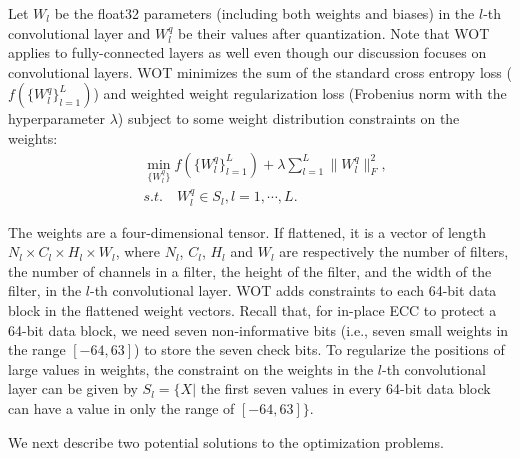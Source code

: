 \documentclass{article}
\begin{document}
Let $W_l$ be the float32 parameters (including both weights and biases) in the $l$-th convolutional layer and $W_l^q$ be their values after quantization. Note that WOT applies to fully-connected layers as well even though our discussion focuses on convolutional layers.  WOT minimizes the sum of the standard cross entropy loss ($f(\{W_l^q\}_{l=1}^{L})$) and weighted weight regularization loss (Frobenius norm with the hyperparameter $\lambda$) subject to some weight distribution constraints on the weights:
\begin{align}
    & \min_{\{W_l^q\}} f(\{W_l^q\}_{l=1}^{L}) + \lambda \sum_{l=1}^L\|W_l^q\|_F^2, \label{eq:loss}\\
    & s.t. \quad W_l^q \in S_l, l = 1, \cdots, L. \label{eq:constraint}
\end{align}

The weights are a four-dimensional tensor. If flattened, it is a vector of length $N_l\times C_l \times H_l \times W_l$, where $N_l$, $C_l$, $H_l$ and $W_l$ are respectively the number of filters, the number of channels in a filter, the height of the filter, and the width of the filter, in the $l$-th convolutional layer. WOT adds constraints to each 64-bit data block in the flattened weight vectors. 
% 
Recall that, for in-place ECC to protect a 64-bit data block, we need seven non-informative bits (i.e., seven small weights in the range $[-64, 63]$) to store the seven check bits. To regularize the positions of large values in weights, the constraint on the weights in the $l$-th convolutional layer can be given by $S_l = \{X|$ the first seven values in every 64-bit data block can have a value in only the range of $[-64, 63]\}$. 

We next describe two potential solutions to the optimization problems.  
% 
% 
\end{document}
